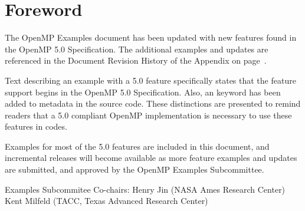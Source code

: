 \pagebreak
\chapter*{Foreword}
\label{chap:foreword}

The OpenMP Examples document has been updated with new features
found in the OpenMP 5.0 Specification. The additional examples and updates
are referenced in the Document Revision History of the Appendix on page~\pageref{chap:history}.

Text describing an example with a 5.0 feature specifically states
that the feature support begins in the OpenMP 5.0 Specification.  Also,
an  keyword has been added to metadata in the source code.
These distinctions are presented to remind readers that a 5.0 compliant 
OpenMP implementation is necessary to use these features in codes.

Examples for most of the 5.0 features are included in this document,
and incremental releases will become available as more feature examples
and updates are submitted, and approved by the OpenMP Examples Subcommittee.

\bigskip
Examples Subcommitee Co-chairs: \smallskip\linebreak
Henry Jin (\textsc{NASA} Ames Research Center) \linebreak
Kent Milfeld (\textsc{TACC}, Texas Advanced Research Center)
